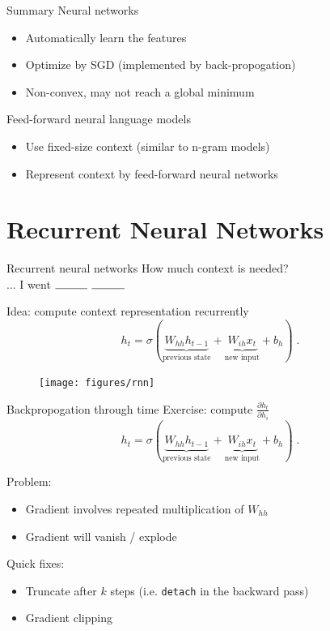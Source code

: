 \documentclass[usenames,dvipsnames,notes]{beamer}
\begin{document}
\begin{frame}
    {Summary}
    Neural networks\\
    \begin{itemize}
        \item Automatically learn the features
        \item Optimize by SGD (implemented by back-propogation)
        \item Non-convex, may not reach a global minimum
    \end{itemize}

    Feed-forward neural language models\\
    \begin{itemize}
        \item Use fixed-size context (similar to n-gram models)
        \item Represent context by feed-forward neural networks
    \end{itemize}
\end{frame}

\section{Recurrent Neural Networks}

\begin{frame}
    {Recurrent neural networks}
    How much context is needed?\\
    ... I went $\rule{1cm}{0.15mm}$ $\rule{1cm}{0.15mm}$

    Idea: compute context representation recurrently
    $$
 h_t = \sigma(\underbrace{W_{hh}h_{t-1}}_{\text{previous state}}+
 \underbrace{W_{ih}x_t}_{\text{new input}} + b_h)
 \;.
    $$

    \begin{figure}
        \texttt{[image: figures/rnn]}
    \end{figure}
\end{frame}

\begin{frame}
    {Backpropogation through time}
    Exercise: compute $\frac{\partial h_t}{\partial h_i}$
    $$
 h_t = \sigma(\underbrace{W_{hh}h_{t-1}}_{\text{previous state}}+
 \underbrace{W_{ih}x_t}_{\text{new input}} + b_h)
 \;.
    $$

    Problem:\\
    \begin{itemize}
        \item Gradient involves repeated multiplication of $W_{hh}$
        \item Gradient will vanish / explode
    \end{itemize}

    Quick fixes:\\
    \begin{itemize}
        \item Truncate after $k$ steps (i.e. \texttt{detach} in the backward pass)
        \item Gradient clipping
    \end{itemize}
\end{frame}
\end{document}
